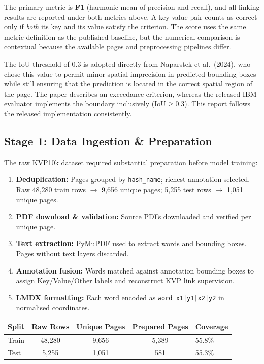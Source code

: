 \documentclass[11pt,a4paper]{article}
\begin{document}
\noindent The primary metric is \textbf{F1} (harmonic mean of precision and recall), and all linking results are reported under both metrics above. A key-value pair counts as correct only if \emph{both} its key and its value satisfy the criterion. The score uses the same metric definition as the published baseline, but the numerical comparison is contextual because the available pages and preprocessing pipelines differ.

\noindent
The IoU threshold of $0.3$ is adopted directly from Naparstek et al.\ (2024), who chose this value to permit minor spatial imprecision in predicted bounding boxes while still ensuring that the prediction is located in the correct spatial region of the page.
The paper describes an exceedance criterion, whereas the released IBM evaluator implements the boundary inclusively ($\mathrm{IoU}\ge 0.3$). This report follows the released implementation consistently.

\subsection{Stage 1: Data Ingestion \& Preparation}

The raw KVP10k dataset required substantial preparation before model training:

\begin{enumerate}[nosep, leftmargin=1.5em]
  \item \textbf{Deduplication:} Pages grouped by \texttt{hash\_name}; richest annotation selected. Raw 48{,}280 train rows $\to$ 9{,}656 unique pages; 5{,}255 test rows $\to$ 1{,}051 unique pages.
  \item \textbf{PDF download \& validation:} Source PDFs downloaded and verified per unique page.
  \item \textbf{Text extraction:} PyMuPDF used to extract words and bounding boxes. Pages without text layers discarded.
  \item \textbf{Annotation fusion:} Words matched against annotation bounding boxes to assign Key/Value/Other labels and reconstruct KVP link supervision.
  \item \textbf{LMDX formatting:} Each word encoded as \texttt{word x1|y1|x2|y2} in normalised coordinates.
\end{enumerate}

\begin{center}
\begin{tabular}{lcccl}
\toprule
\textbf{Split} & \textbf{Raw Rows} & \textbf{Unique Pages} & \textbf{Prepared Pages} & \textbf{Coverage} \\
\midrule
Train & 48{,}280 & 9{,}656 & 5{,}389 & 55.8\% \\
Test  & 5{,}255  & 1{,}051 & 581    & 55.3\% \\
\bottomrule
\end{tabular}
\end{center}
\end{document}
